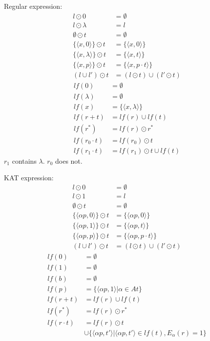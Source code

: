 \documentclass[10pt]{article}
\begin{document}
\newpage
\begin{minipage}{0.45\textwidth}
Regular expression:\\
\begin{align*}
    l\odot 0&=\emptyset\\
    l\odot \lambda&= l\\
    \emptyset\odot t&=\emptyset\\
    \{\langle x,0\rangle\}\odot t&=\{\langle x,0\rangle\}\\
    \{\langle x,\lambda\rangle\}\odot t&=\{\langle x,t\rangle\}\\
    \{\langle x,p\rangle\}\odot t&=\{\langle x,p\cdot t\rangle\}\\
    (l\cup l')\odot t&=(l\odot t)\cup (l'\odot t)
\end{align*}
\begin{align*}
    lf(0)&=\emptyset\\
    lf(\lambda)&=\emptyset\\
    lf(x)&=\{\langle x,\lambda\rangle\}\\
    lf(r+t)&=lf(r)\cup lf(t)\\
    lf(r^*)&=lf(r)\odot r^*\\
    lf(r_0\cdot t)&=lf(r_0)\odot t\\
    lf(r_1\cdot t)&=lf(r_1)\odot t\cup lf(t)
\end{align*}
$r_1$ contains $\lambda$. $r_0$ does not.
\end{minipage}%
\hfill
\begin{minipage}{0.45\textwidth}
KAT expression:\\
\begin{align*}
    l\odot 0&=\emptyset\\
    l\odot 1&= l\\
    \emptyset\odot t&=\emptyset\\
    \{\langle \alpha p,0\rangle\}\odot t&=\{\langle \alpha p,0\rangle\}\\
    \{\langle \alpha p,1\rangle\}\odot t&=\{\langle \alpha p,t\rangle\}\\
    \{\langle \alpha p,p\rangle\}\odot t&=\{\langle \alpha p,p\cdot t\rangle\}\\
    (l\cup l')\odot t&=(l\odot t)\cup (l'\odot t)
\end{align*}
\begin{align*}
    lf(0)&=\emptyset\\
    lf(1)&=\emptyset\\
    lf(b)&=\emptyset\\
    lf(p)&=\{\langle \alpha p,1\rangle|\alpha\in At\}\\
    lf(r+t)&=lf(r)\cup lf(t)\\
    lf(r^*)&=lf(r)\odot r^*\\
    lf(r\cdot t)&=lf(r)\odot t\\
    &\cup \{\langle \alpha p,t'\rangle|\langle \alpha p,t'\rangle\in lf(t), E_{\alpha}(r)=1\}
\end{align*}
\end{minipage}%
\end{document}
